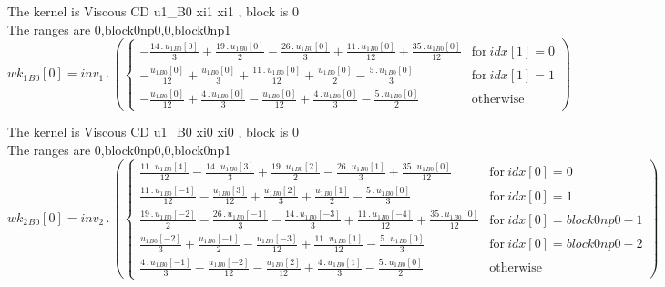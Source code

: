 \documentclass{article}
\begin{document}
\noindent The kernel is Viscous CD u1_B0 xi1 xi1 , block is 0\\\noindent The ranges are 0,block0np0,0,block0np1\\\begin{dmath}{wk_{1}{_{B0}}}[{0}] = inv_1 \,.\, \left(\begin{cases} - \frac{14 \,.\, {u_{1}{_{B0}}}[{0}]}{3} + \frac{19 \,.\, {u_{1}{_{B0}}}[{0}]}{2} - \frac{26 \,.\, {u_{1}{_{B0}}}[{0}]}{3} + \frac{11 \,.\, {u_{1}{_{B0}}}[{0}]}{12} + \frac{35 \,.\, 
{u_{1}{_{B0}}}[{0}]}{12} & \text{for}\: {idx}[{1}] = 0 \\- \frac{{u_{1}{_{B0}}}[{0}]}{12} + \frac{{u_{1}{_{B0}}}[{0}]}{3} + \frac{11 \,.\, {u_{1}{_{B0}}}[{0}]}{12} + \frac{{u_{1}{_{B0}}}[{0}]}{2} - \frac{5 \,.\, {u_{1}{_{B0}}}[{0}]}{3} & \text{for}\: 
{idx}[{1}] = 1 \\- \frac{{u_{1}{_{B0}}}[{0}]}{12} + \frac{4 \,.\, {u_{1}{_{B0}}}[{0}]}{3} - \frac{{u_{1}{_{B0}}}[{0}]}{12} + \frac{4 \,.\, {u_{1}{_{B0}}}[{0}]}{3} - \frac{5 \,.\, {u_{1}{_{B0}}}[{0}]}{2} & \text{otherwise} 
\end{cases}\right)\end{dmath}

\noindent The kernel is Viscous CD u1_B0 xi0 xi0 , block is 0\\\noindent The ranges are 0,block0np0,0,block0np1\\\begin{dmath}{wk_{2}{_{B0}}}[{0}] = inv_2 \,.\, \left(\begin{cases} \frac{11 \,.\, {u_{1}{_{B0}}}[{4}]}{12} - \frac{14 \,.\, {u_{1}{_{B0}}}[{3}]}{3} + \frac{19 \,.\, {u_{1}{_{B0}}}[{2}]}{2} - \frac{26 \,.\, {u_{1}{_{B0}}}[{1}]}{3} + \frac{35 \,.\, 
{u_{1}{_{B0}}}[{0}]}{12} & \text{for}\: {idx}[{0}] = 0 \\\frac{11 \,.\, {u_{1}{_{B0}}}[{-1}]}{12} - \frac{{u_{1}{_{B0}}}[{3}]}{12} + \frac{{u_{1}{_{B0}}}[{2}]}{3} + \frac{{u_{1}{_{B0}}}[{1}]}{2} - \frac{5 \,.\, {u_{1}{_{B0}}}[{0}]}{3} & \text{for}\: 
{idx}[{0}] = 1 \\\frac{19 \,.\, {u_{1}{_{B0}}}[{-2}]}{2} - \frac{26 \,.\, {u_{1}{_{B0}}}[{-1}]}{3} - \frac{14 \,.\, {u_{1}{_{B0}}}[{-3}]}{3} + \frac{11 \,.\, {u_{1}{_{B0}}}[{-4}]}{12} + \frac{35 \,.\, {u_{1}{_{B0}}}[{0}]}{12} & \text{for}\: 
{idx}[{0}] = block0np0 - 1 \\\frac{{u_{1}{_{B0}}}[{-2}]}{3} + \frac{{u_{1}{_{B0}}}[{-1}]}{2} - \frac{{u_{1}{_{B0}}}[{-3}]}{12} + \frac{11 \,.\, {u_{1}{_{B0}}}[{1}]}{12} - \frac{5 \,.\, {u_{1}{_{B0}}}[{0}]}{3} & \text{for}\: {idx}[{0}] = block0np0 - 2 
\\\frac{4 \,.\, {u_{1}{_{B0}}}[{-1}]}{3} - \frac{{u_{1}{_{B0}}}[{-2}]}{12} - \frac{{u_{1}{_{B0}}}[{2}]}{12} + \frac{4 \,.\, {u_{1}{_{B0}}}[{1}]}{3} - \frac{5 \,.\, {u_{1}{_{B0}}}[{0}]}{2} & \text{otherwise} \end{cases}\right)\end{dmath}
\end{document}

